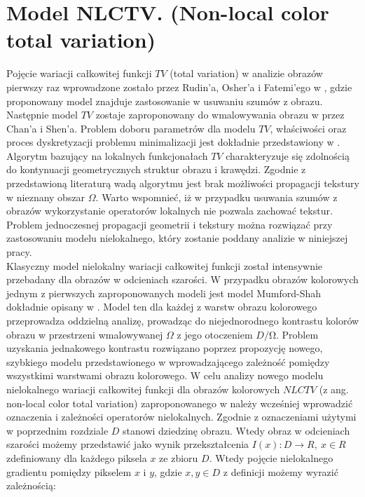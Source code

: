 \documentclass[12pt, twoside, openany]{report}
\theoremstyle{definition}
\begin{document}
\section{Model NLCTV. (Non-local color total variation)}
Pojęcie wariacji całkowitej funkcji $TV$ (total variation) w analizie obrazów pierwszy raz wprowadzone zostało przez Rudin'a, Osher'a i Fatemi’ego w \cite{rudin1992nonlinear}, gdzie proponowany model znajduje zastosowanie w usuwaniu szumów z obrazu. Następnie model $TV$ zostaje zaproponowany do wmalowywania obrazu w \cite{MathematicalModelsforNLTextureInpainting} przez Chan'a i Shen’a. Problem doboru parametrów dla modelu $TV$, właściwości oraz proces dyskretyzacji problemu minimalizacji jest dokładnie przedstawiony w \cite{getreuer2012total}. Algorytm bazujący na lokalnych funkcjonałach $TV$  charakteryzuje się zdolnością do kontynuacji geometrycznych struktur obrazu i krawędzi. Zgodnie z przedstawioną literaturą wadą algorytmu jest brak możliwości propagacji tekstury w nieznany obszar $\Omega$. Warto wspomnieć, iż w przypadku usuwania szumów z obrazów wykorzystanie operatorów lokalnych nie pozwala zachować tekstur. Problem jednoczesnej propagacji geometrii i tekstury można rozwiązać przy zastosowaniu modelu nielokalnego, który zostanie poddany analizie w niniejszej pracy. \\
Klasyczny model nielokalny wariacji całkowitej funkcji został intensywnie przebadany dla obrazów w odcieniach szarości. W przypadku obrazów kolorowych jednym z pierwszych zaproponowanych modeli jest model Mumford-Shah dokładnie opisany w \cite{jung2011nonlocal}. Model ten dla każdej z warstw obrazu kolorowego przeprowadza oddzielną analizę, prowadząc do niejednorodnego kontrastu kolorów obrazu w przestrzeni wmalowywanej $\Omega$ z jego otoczeniem $D/\mathrm{\Omega}$. Problem uzyskania jednakowego kontrastu rozwiązano poprzez propozycję nowego, szybkiego modelu przedstawionego w \cite{duan2015fast} wprowadzającego zależność pomiędzy wszystkimi warstwami obrazu kolorowego. W celu analizy nowego modelu nielokalnego wariacji całkowitej funkcji dla obrazów kolorowych $NLCTV$ (z ang. non-local color total variation) zaproponowanego w \cite{duan2015fast} należy wcześniej wprowadzić oznaczenia i zależności operatorów nielokalnych. 
Zgodnie z oznaczeniami użytymi w poprzednim rozdziale $D$ stanowi dziedzinę obrazu. Wtedy obraz w odcieniach szarości możemy przedstawić jako wynik przekształcenia $I\left(x\right):D\longrightarrow R,\ x\in R$ zdefiniowany dla każdego piksela $x$ ze zbioru $D$. Wtedy pojęcie nielokalnego gradientu pomiędzy pikselem $x$ i $y$, gdzie $x,y\in D$ z definicji możemy wyrazić zależnością:
\end{document}
